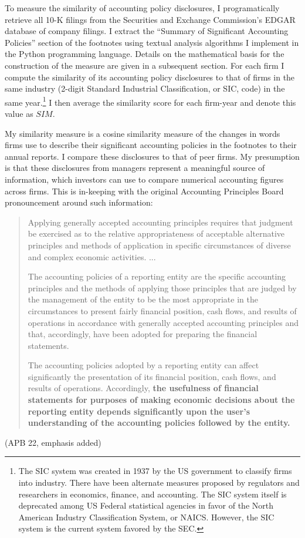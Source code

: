 \documentclass[thesis]{thesis-umich}
\begin{document}
To measure the similarity of accounting policy disclosures, I programatically retrieve all 10-K filings from the Securities and Exchange Commission's EDGAR database of company filings. I extract the ``Summary of Significant Accounting Policies'' section of the footnotes using textual analysis algorithms I implement in the Python programming language. Details on the mathematical basis for the construction of the measure are given in a subsequent section. For each firm I compute the similarity of its accounting policy disclosures to that of firms in the same industry (2-digit Standard Industrial Classification, or SIC, code) in the same year.\footnote{The SIC system was created in 1937 by the US government to classify firms into industry. There have been alternate measures proposed by regulators and researchers in economics, finance, and accounting. The SIC system itself is deprecated among US Federal statistical agencies in favor of the North American Industry Classification System, or NAICS. However, the SIC system is the current system favored by the SEC.} I then average the similarity score for each firm-year and denote this value as $SIM$. 

My similarity measure is a cosine similarity measure of the changes in words firms use to describe  their significant accounting policies in the footnotes to their annual reports. I compare these disclosures to that of peer firms. My presumption is that these disclosures from managers represent a meaningful source of information, which investors can use to compare numerical accounting figures across firms. This is in-keeping with the original Accounting Principles Board pronouncement around such information:

\begin{quote}
\footnotesize
Applying generally accepted accounting principles requires that judgment be exercised as to the relative appropriateness of acceptable alternative principles and methods of application in specific circumstances of diverse and complex economic activities. ...

The accounting policies of a reporting entity are the specific accounting principles and the methods of applying those principles that are judged by the management of the entity to be the most appropriate in the circumstances to present fairly financial position, cash flows, and results of operations in accordance with generally accepted accounting principles and that, accordingly, have been adopted for preparing the financial statements.

The accounting policies adopted by a reporting entity can affect significantly the presentation of its financial position, cash flows, and results of operations. Accordingly, \textbf{the usefulness of financial statements for purposes of making economic decisions about the reporting entity depends significantly upon the user's understanding of the accounting policies followed by the entity.}
\end{quote}
(APB 22, emphasis added)
\end{document}
